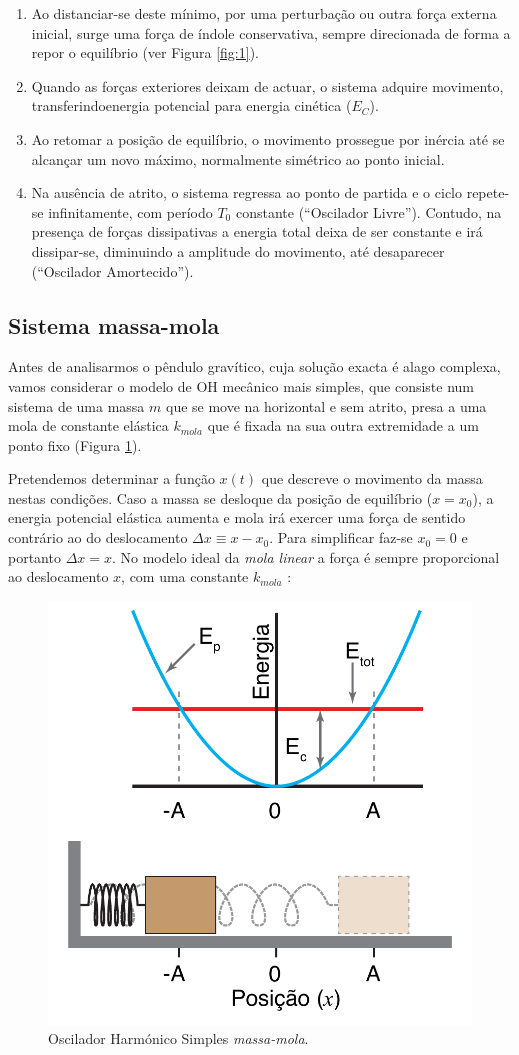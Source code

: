 \documentclass[a4paper,twoside,12pt]{article}      %
\begin{document}
\begin{enumerate}
\item  Ao distanciar-se deste mínimo, por uma perturbação ou outra força externa inicial, 
surge uma força de índole conservativa, sempre direcionada de forma a repor o equilíbrio (ver Figura \ref{fig:1}).
\item Quando as forças exteriores deixam de actuar, o sistema adquire movimento, 
transferindoenergia potencial para energia cinética ($E_C$).
\item Ao retomar a posição de equilíbrio, o movimento prossegue por inércia até se alcançar um 
novo máximo, normalmente simétrico ao ponto inicial.
\item Na ausência de atrito, o sistema regressa  ao ponto de partida e o ciclo repete-se infinitamente, com período $T_0$ constante (``Oscilador Livre''). Contudo, na presença de forças dissipativas a energia total deixa de ser constante e irá dissipar-se, diminuindo a amplitude do movimento, até desaparecer (``Oscilador Amortecido'').
\end{enumerate}


\subsection{\sf Sistema massa-mola}
Antes de analisarmos o pêndulo gravítico, cuja solução exacta é alago complexa, vamos considerar o modelo de OH mecânico mais simples, que consiste num sistema de uma massa $m$ que se 
move na horizontal e sem atrito,  presa a uma mola de constante elástica $k_{mola}$ que é fixada na sua outra extremidade a um ponto fixo (Figura \ref{fig:2}). 

Pretendemos determinar a função $x(t)$ que descreve o movimento da massa nestas condições. Caso a massa se desloque da posição de equilíbrio ($x =x_0$), a energia potencial elástica aumenta e mola irá exercer uma força de sentido contrário ao do deslocamento $\Delta x \equiv x - x_0$. 
Para simplificar faz-se $x_0=0$ e portanto $\Delta x = x$.
 No modelo ideal da \emph{ mola linear} a força é sempre proporcional ao deslocamento $x$, com uma constante $k_{mola}$ :

\begin{figure}
	[b] \centering 
	\includegraphics[width=0.4	\textwidth]{harmonic_oscillator} 
	\caption{Oscilador Harmónico Simples \emph{massa-mola}.  \label{fig:2}} 
\end{figure}
\end{document}
